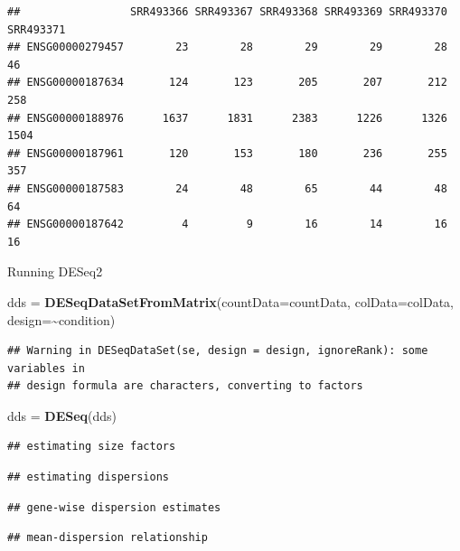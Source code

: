 \documentclass[
]{article}
\newenvironment{Shaded}{\begin{snugshade}}{\end{snugshade}}
\newcommand{\AttributeTok}[1]{\textcolor[rgb]{0.13,0.29,0.53}{#1}}
\newcommand{\FunctionTok}[1]{\textcolor[rgb]{0.13,0.29,0.53}{\textbf{#1}}}
\newcommand{\NormalTok}[1]{#1}
\newcommand{\OtherTok}[1]{\textcolor[rgb]{0.56,0.35,0.01}{#1}}
\newcommand{\SpecialCharTok}[1]{\textcolor[rgb]{0.81,0.36,0.00}{\textbf{#1}}}
\begin{document}
\begin{verbatim}
##                 SRR493366 SRR493367 SRR493368 SRR493369 SRR493370 SRR493371
## ENSG00000279457        23        28        29        29        28        46
## ENSG00000187634       124       123       205       207       212       258
## ENSG00000188976      1637      1831      2383      1226      1326      1504
## ENSG00000187961       120       153       180       236       255       357
## ENSG00000187583        24        48        65        44        48        64
## ENSG00000187642         4         9        16        14        16        16
\end{verbatim}

Running DESeq2

\begin{Shaded}
\begin{Highlighting}[]
\NormalTok{dds }\OtherTok{=} \FunctionTok{DESeqDataSetFromMatrix}\NormalTok{(}\AttributeTok{countData=}\NormalTok{countData,}
                             \AttributeTok{colData=}\NormalTok{colData,}
                             \AttributeTok{design=}\SpecialCharTok{\textasciitilde{}}\NormalTok{condition)}
\end{Highlighting}
\end{Shaded}

\begin{verbatim}
## Warning in DESeqDataSet(se, design = design, ignoreRank): some variables in
## design formula are characters, converting to factors
\end{verbatim}

\begin{Shaded}
\begin{Highlighting}[]
\NormalTok{dds }\OtherTok{=} \FunctionTok{DESeq}\NormalTok{(dds)}
\end{Highlighting}
\end{Shaded}

\begin{verbatim}
## estimating size factors
\end{verbatim}

\begin{verbatim}
## estimating dispersions
\end{verbatim}

\begin{verbatim}
## gene-wise dispersion estimates
\end{verbatim}

\begin{verbatim}
## mean-dispersion relationship
\end{verbatim}
\end{document}
